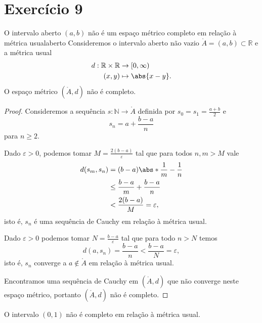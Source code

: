 \section*{Exercício 9}

\begin{proposition}{O intervalo aberto \((a,b)\) não é um espaço métrico completo em relação à métrica usual}{aberto}
    Consideremos o intervalo aberto não vazio \(\mathring{A} = (a,b) \subset \mathbb{R}\) e a métrica usual
    \begin{align*}
        d : \mathbb{R} \times \mathbb{R} &\to [0, \infty)\\
                                   (x,y) &\mapsto \abs{x - y}.
    \end{align*}
    O espaço métrico \((\mathring{A}, d)\) não é completo.
\end{proposition}
\begin{proof}
    Consideremos a sequência \(s : \mathbb{N} \to \mathring{A}\) definida por \(s_0 = s_1 = \frac{a+b}{2}\) e
    \begin{equation*}
        s_n = a + \frac{b - a}{n}
    \end{equation*}
    para \(n \geq 2\).

    Dado \(\varepsilon > 0\), podemos tomar \(M = \frac{2(b-a)}{\varepsilon}\) tal que para todos \(n,m > M\) vale
    \begin{align*}
        d(s_m, s_n) &= (b - a) \abs*{\frac{1}{m} - \frac{1}{n}}\\
                    &\leq \frac{b - a}{m} + \frac{b - a}{n}\\
                    &< \frac{2(b - a)}{M} = \varepsilon,
    \end{align*}
    isto é, \(s_n\) é uma sequência de Cauchy em relação à métrica usual.


    Dado \(\varepsilon > 0\) podemos tomar \(N = \frac{b-a}{\varepsilon}\) tal que para todo \(n > N\) temos
    \begin{equation*}
        d(a, s_n) = \frac{b - a}{n} < \frac{b-a}{N} = \varepsilon,
    \end{equation*}
    isto é, \(s_n\) converge a \(a \notin \mathring{A}\) em relação à métrica usual.

    Encontramos uma sequência de Cauchy em \((\mathring{A}, d)\) que não converge neste espaço métrico, portanto \((\mathring{A},d)\) não é completo.
\end{proof}
\begin{corollary}
    O intervalo \((0,1)\) não é completo em relação à métrica usual.
\end{corollary}

